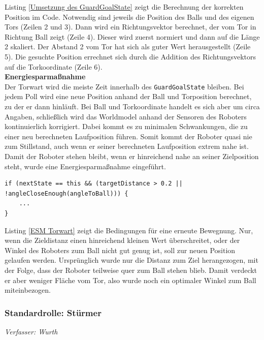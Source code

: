 \documentclass[fontsize=12pt,a4paper,final]{scrartcl}[2003/01/01]
\begin{document}
Listing \ref{Umsetzung des GuardGoalState} zeigt die Berechnung der korrekten Position im Code. Notwendig sind jeweils die Position des Balls und des eigenen Tors (Zeilen 2 und 3). Dann wird ein Richtungsvektor berechnet, der vom Tor in Richtung Ball zeigt (Zeile 4). Dieser wird zuerst normiert und dann auf die Länge 2 skaliert. Der Abstand 2 vom Tor hat sich als guter Wert herausgestellt (Zeile 5). Die gesuchte Position errechnet sich durch die Addition des Richtungsvektors auf die Torkoordinate (Zeile 6).
\\

\textbf{Energiesparmaßnahme}
\\

Der Torwart wird die meiste Zeit innerhalb des \lstinline$GuardGoalState$ bleiben. Bei jedem Poll wird eine neue Position anhand der Ball und Torposition berechnet, zu der er dann hinläuft. Bei Ball und Torkoordinate handelt es sich aber um circa Angaben, schließlich wird das Worldmodel anhand der Sensoren des Roboters kontinuierlich korrigiert. Dabei kommt es zu minimalen Schwankungen, die zu einer neu berechneten Laufposition führen. Somit kommt der Roboter quasi nie zum Stillstand, auch wenn er seiner berechneten Laufposition extrem nahe ist. Damit der Roboter stehen bleibt, wenn er hinreichend nahe an seiner Zielposition steht, wurde eine Energiesparmaßnahme eingeführt.
\\

\begin{lstlisting}[caption=Energiesparmaßnahme Torwart, captionpos=b, label= ESM Torwart]
if (nextState == this && (targetDistance > 0.2 || !angleCloseEnough(angleToBall))) {
	...
} 

\end{lstlisting}

Listing \ref{ESM Torwart} zeigt die Bedingungen für eine erneute Bewegnung. Nur, wenn die Zieldistanz einen hinreichend kleinen Wert überschreitet, oder der Winkel des Roboters zum Ball nicht gut genug ist, soll zur neuen Position gelaufen werden. Ursprünglich wurde nur die Distanz zum Ziel herangezogen, mit der Folge, dass der Roboter teilweise quer zum Ball stehen blieb. Damit verdeckt er aber weniger Fläche vom Tor, also wurde noch ein optimaler Winkel zum Ball miteinbezogen.

\pagebreak 

\subsubsection{Standardrolle: Stürmer}
\textit{Verfasser: Wurth}\\
\end{document}
